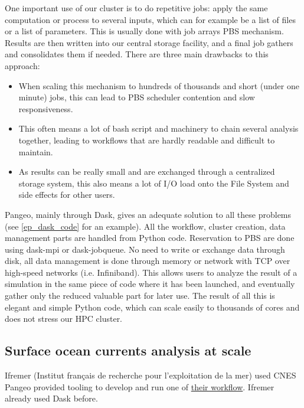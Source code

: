 \documentclass{article}
\begin{document}
One important use of our cluster is to do repetitive jobs: apply the same computation or process to several inputs, which can for example be a list of files or a list of parameters. This is usually done with job arrays PBS mechanism. Results are then written into our central storage facility, and a final job gathers and consolidates them if needed. There are three main drawbacks to this approach:
\begin{itemize}
\item When scaling this mechanism to hundreds of thousands and short (under one minute) jobs, this can lead to PBS scheduler contention and slow responsiveness.
\item This often means a lot of bash script and machinery to chain several analysis together, leading to workflows that are hardly readable and difficult to maintain.
\item As results can be really small and are exchanged through a centralized storage system, this also means a lot of I/O load onto the File System and side effects for other users.
\end{itemize}

Pangeo, mainly through Dask, gives an adequate solution to all these problems (see \ref{ep_dask_code} for an example). All the workflow, cluster creation, data management parts are handled from Python code. Reservation to PBS are done using dask-mpi or dask-jobqueue. No need to write or exchange data through disk, all data management is done through memory or network with TCP over high-speed networks (i.e. Infiniband). This allows users to analyze the result of a simulation in the same piece of code where it has been launched, and eventually gather only the reduced valuable part for later use. The result of all this is elegant and simple Python code, which can scale easily to thousands of cores and does not stress our HPC cluster.

\subsection{Surface ocean currents analysis at scale}
\label{ssec:usecase3}

Ifremer (Institut français de recherche pour l'exploitation de la mer) used CNES
Pangeo provided tooling to develop and run one of 
\href{https://github.com/apatlpo/mit_equinox/blob/master/hal/rechunk_rotspectra.ipynb}{their workflow}. Ifremer already used Dask before\cite{b9}.
\end{document}

